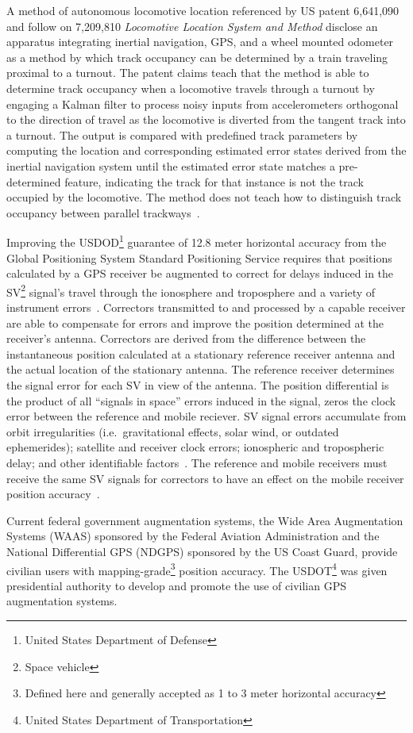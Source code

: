 A method of autonomous locomotive location referenced by US patent 6,641,090 and follow on 7,209,810 \emph{Locomotive Location System and Method} disclose an apparatus integrating inertial navigation, GPS, and a wheel mounted odometer as a method by which track occupancy can be determined by a train traveling proximal to a turnout. The patent claims teach that the method is able to determine track occupancy when a locomotive travels through a turnout by engaging a Kalman filter to process noisy inputs from accelerometers orthogonal to the direction of travel as the locomotive is diverted from the tangent track into a turnout. The output is compared with predefined track parameters by computing the location and corresponding estimated error states derived from the inertial navigation system until the estimated error state matches a pre-determined feature, indicating the track for that instance is not the track occupied by the locomotive. The method does not teach how to distinguish track occupancy between parallel trackways~\citep{2007lockheed}.

Improving the USDOD\footnote{United States Department of Defense} guarantee of  12.8 meter horizontal accuracy from the Global Positioning System Standard Positioning Service requires that positions calculated by a GPS receiver be augmented to correct for delays induced in the SV\footnote{Space vehicle} signal's travel through the ionosphere and troposphere and a variety of instrument errors~\citep{2001DoDGPSperf}. Correctors transmitted to and processed by a capable receiver are able to compensate for errors and improve the position determined at the receiver's antenna. Correctors are derived from the difference between the instantaneous position calculated at a stationary reference receiver antenna and the actual location of the stationary antenna. The reference receiver determines the signal error for each SV in view of the antenna. The position differential is the product of all ``signals in space'' errors induced in the signal, zeros the clock error between the reference and mobile reciever. SV signal errors accumulate from orbit irregularities (i.e.\ gravitational effects, solar wind, or outdated ephemerides); satellite and receiver clock errors; ionospheric and tropospheric delay; and other identifiable factors~\citep{2004leick}. The reference and mobile receivers must receive the same SV signals for correctors to have an effect on the mobile receiver position accuracy~\citep{2008USDoT_NDGPS}.

Current federal government augmentation systems, the Wide Area Augmentation Systems (WAAS) sponsored by the Federal Aviation Administration and the National Differential GPS (NDGPS) sponsored by the US Coast Guard, provide civilian users with mapping-grade\footnote{Defined here and generally accepted as 1 to 3 meter horizontal accuracy} position accuracy. The USDOT\footnote{United States Department of Transportation} was given presidential authority to develop and promote the use of civilian GPS augmentation systems. 

